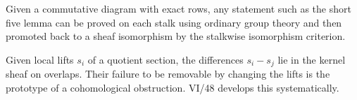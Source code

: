 \begin{example}
Given a commutative diagram with exact rows, any statement such as the short five lemma can be proved on each stalk using ordinary group theory and then promoted back to a sheaf isomorphism by the stalkwise isomorphism criterion.
\end{example}

\begin{example}
Given local lifts $s_i$ of a quotient section, the differences $s_i-s_j$ lie in the kernel sheaf on overlaps.  Their failure to be removable by changing the lifts is the prototype of a cohomological obstruction.  VI/48 develops this systematically.
\end{example}




